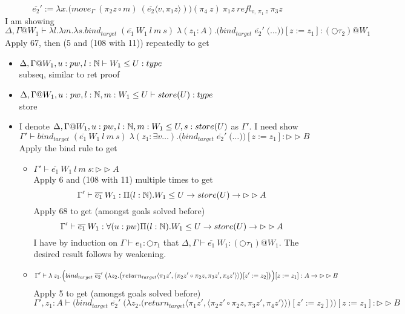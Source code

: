 \documentclass{article}
\begin{document}
\[\overline{e_2}' := \lambda x. \big(move_{\Gamma} \: (\pi_2 z \circ m) \: (\overline{e_2}\langle v,  \pi_1 z \rangle) \big) (\pi_4 \: z) \: \pi_1 z \: refl_{v, \: \pi_1 \: z} \: \pi_3 z\]
I am showing
\[\Delta,\Gamma@W_1 \vdash \lambda l. \lambda m . \lambda s. bind_{target}\;(\overline{e_1}\: W_1 \: l \: m \: s) \; \lambda (z_1 : A). \Big( bind_{target} \; \overline{e_2}'
\; 
\big( \dots \big) \Big) [z:= z_1]
: (\bigcirc \tau_2) @ W_1\]
Apply 67, then (5 and (108 with 11)) repeatedly to get
\begin{itemize}
    \item $\Delta,\Gamma@W_1, u: pw, l: \N \vdash W_1 \leq U: type$\\
    subseq, similar to ret proof
    \item $\Delta,\Gamma@W_1, u: pw, l: \N, m: W_1 \leq U \vdash store(U): type$\\
    store
    \item I denote $\Delta,\Gamma@W_1, u: pw, l: \N, m: W_1 \leq U, s: store(U)$ as $\Gamma'$. I need show
    \[\Gamma' \vdash bind_{target}\;(\overline{e_1}\: W_1 \: l \: m \: s) \; \lambda (z_1 : \exists v \dots ).\Big( bind_{target} \; \overline{e_2}'
\; 
\big( \dots \big) \Big) [z:= z_1] : \rhd \rhd B\]
Apply the bind rule to get
\begin{itemize}
    \item $\Gamma' \vdash \overline{e_1}\: W_1 \: l \: m \: s : \rhd \rhd A $\\
    Apply 6 and (108 with 11) multiple times to get
    \[\Gamma' \vdash \overline{e_1} \: W_1 : \Pi(l: \mathbb{N}). W_1 \leq U \rightarrow store(U) \rightarrow \rhd \rhd A\]
    Apply 68 to get (amongst goals solved before)
     \[\Gamma' \vdash \overline{e_1} \: W_1 : \forall(u: pw)\Pi(l: \mathbb{N}). W_1 \leq U \rightarrow store(U) \rightarrow \rhd \rhd A\]
    I have by induction on $\Gamma \vdash e_1 : \bigcirc \tau_1$ that $\Delta, \Gamma \vdash \overline{e_1} \: W_1 : (\bigcirc \tau_1) @ W_1$. The desired result follows by weakening. 
    \item \[\Gamma' \vdash \lambda \:z_1.\Big( bind_{target} \; \overline{e_2}'
\; \big(\lambda z_2. \big(return_{target}\langle \pi_1 z', \langle \pi_2 z' \circ \pi_2 z, \pi_3 z', \pi_4 z' \rangle \rangle \big)[z' := z_2]\big) \Big) [z:= z_1] : A \rightarrow \rhd \rhd B\]
Apply 5 to get (amongst goals solved before)
\[\Gamma', z_1: A  \vdash \Big( bind_{target} \; \overline{e_2}'
\; \big(\lambda z_2. \big(return_{target}\langle \pi_1 z', \langle \pi_2 z' \circ \pi_2 z, \pi_3 z', \pi_4 z' \rangle \rangle \big)[z' := z_2]\big) \Big) [z:= z_1] : \rhd \rhd B\]

\end{itemize}
\end{itemize}
\end{document}
